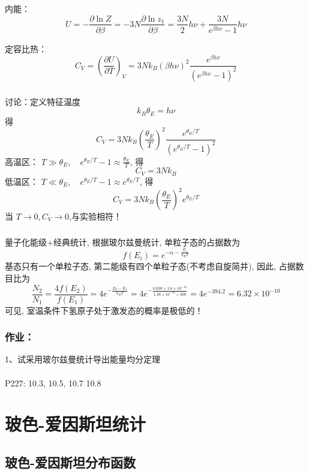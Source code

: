 \begin{frame}
  \frametitle{}
  内能：
  \[ U = -\frac{\partial \ln Z}{\partial \beta } = -3N \frac{\partial \ln z_1}{\partial \beta } = \frac{3N}{2} h \nu + \frac{3N}{e^{\beta h \nu} -1 } h \nu \] 

  定容比热： 
  \[ C_V = \left(\frac{\partial U}{\partial T }\right)_V = 3N k_B  (\beta h \nu)^2 \frac{e^{\beta h \nu}}{\left( e^{\beta h \nu} -1 \right)^2} \]
\end{frame} 

\begin{frame}
  \frametitle{}
讨论：定义特征温度 
\[ k_B \theta _E  = h \nu \]
得
\[ C_V = 3N k_B  (\frac{\theta _E}{T})^2 \frac{e^{\theta _E / T}}{\left( e^{\theta _E / T} -1 \right)^2} \]
高温区： $T\gg \theta _E, \quad e^{\theta _E / T} -1 \approx  \frac{\theta _E}{T} $, 得
\[ C_V = 3N k_B \] 
低温区： $T\ll \theta _E, \quad e^{\theta _E / T} -1 \approx  e^{\theta _E / T} $, 得
\[ C_V = 3N k_B  (\frac{\theta _E}{T})^2 e^{\theta _E / T} \]  
当 $T \to 0, C_V \to 0$,与实验相符！ 
\end{frame} 

\begin{frame}
  \frametitle{}
  \解 量子化能级+经典统计, 根据玻尔兹曼统计, 单粒子态的占据数为
  \[ f(E_i) = e^{-\alpha - \frac{E_i}{k_BT}}\]
  基态只有一个单粒子态, 第二能级有四个单粒子态(不考虑自旋简并), 因此, 占据数目比为
  \[ \frac{N_2}{N_1} = \frac{4 f(E_2)}{f(E_1)}  = 4 e^{-\frac{E_2 - E_1}{k_BT}} = 4 e^{-\frac{0.038\times 1.6\times 10^{-16}}{1.38\times 10^{-23}\times 300}} = 4 e^{- 394.2} = 6.32\times 10^{-10}\]
  可见, 室温条件下氢原子处于激发态的概率是极低的！\\
\end{frame} 

\begin{frame}
  \frametitle{作业：}
  1、试采用玻尔兹曼统计导出能量均分定理\\
  ~~\\ 
  P227: 10.3, 10.5, 10.7 10.8
\end{frame} 

\section{玻色-爱因斯坦统计}

\subsection{玻色-爱因斯坦分布函数}

